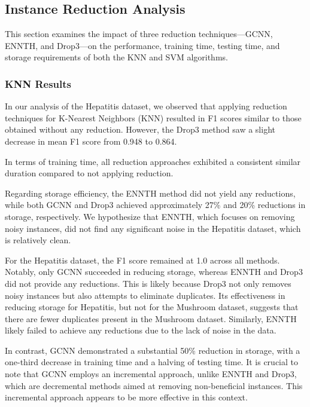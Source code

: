 \subsection{Instance Reduction Analysis}
\label{subsubsec:discussion-reduction}

This section examines the impact of three reduction techniques—GCNN, ENNTH, and Drop3—on the performance, training time, testing time, and storage requirements of both the KNN and SVM algorithms.

\subsubsection{KNN Results}
In our analysis of the Hepatitis dataset, we observed that applying reduction techniques
for K-Nearest Neighbors (KNN) resulted in F1 scores similar to those obtained without any reduction.
However, the Drop3 method saw a slight decrease in mean F1 score from 0.948 to 0.864. 

In terms of training time, all reduction approaches exhibited a consistent similar duration compared to not applying reduction.

Regarding storage efficiency, the ENNTH method did not yield any reductions, while both GCNN and Drop3 achieved approximately
27\% and 20\% reductions in storage, respectively. We hypothesize that ENNTH, which focuses on removing noisy instances, did not
find any significant noise in the Hepatitis dataset, which is relatively clean.

For the Hepatitis dataset, the F1 score remained at 1.0 across all methods. Notably, only GCNN succeeded in reducing storage,
whereas ENNTH and Drop3 did not provide any reductions. This is likely because Drop3 not only removes noisy instances but also
attempts to eliminate duplicates. Its effectiveness in reducing storage for Hepatitis, but not for the Mushroom dataset, suggests
that there are fewer duplicates present in the Mushroom dataset. Similarly, ENNTH likely failed to achieve any reductions due to the lack of noise in the data.

In contrast, GCNN demonstrated a substantial 50\% reduction in storage, with a one-third decrease in training time and a halving of testing time. It is crucial to note that GCNN employs an incremental approach, unlike ENNTH and Drop3, which are decremental methods aimed at removing non-beneficial instances. This incremental approach appears to be more effective in this context.

